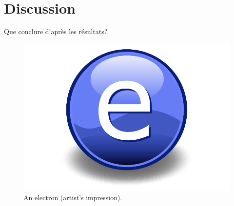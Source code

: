 \chapter{Discussion}
\label{Chap5}
Que conclure d'après les résultats?

\begin{figure}[th]
\centering
\includegraphics{Images/Electron}
\decoRule
\caption[An Electron]{An electron (artist's impression).}
\label{fig:Electron}
\end{figure}